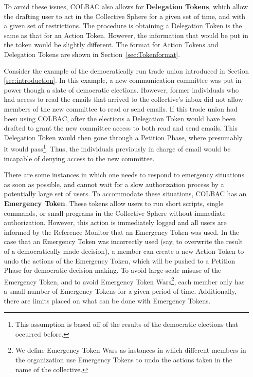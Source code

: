 To avoid these issues, COLBAC also allows for \textbf{Delegation Tokens}, which
allow the drafting user to act in the Collective Sphere for a given set of time,
and with a given set of restrictions. The procedure is obtaining a Delegation
Token is the same as that for an Action Token. However, the information that
would be put in the token would be slightly different. The format for Action
Tokens and Delegation Tokens are shown in Section~\ref{sec:Tokenformat}.

Consider the example of the democratically run trade union introduced in Section 
\ref{sec:introduction}. In this example, a new communication committee was put
in power though a slate of democratic elections. However, former individuals who
had access to read the emails that arrived to the collective's inbox did not
allow members of the new committee to read or send emails. If this trade union
had been using COLBAC, after the elections a Delegation Token would have been
drafted to grant the new committee access to both read and send emails. This
Delegation Token would then gone through a Petition Phase, where presumably it
would pass\footnote{This assumption is based off of the results of the
democratic elections that occurred before.}. Thus, the individuals previously in
charge of email would be incapable of denying access to the new committee.

There are some instances in which one needs to respond to emergency situations
as soon as possible, and cannot wait for a slow authorization process by a
potentially large set of users. To accommodate these situations, COLBAC has an
\textbf{Emergency Token}. These tokens allow users to run short scripts, single
commands, or small programs in the Collective Sphere without immediate
authorization. However, this action is immediately logged and all users are
informed by the Reference Monitor that an Emergency Token was used. In the case
that an Emergency Token was incorrectly used (say, to overwrite the result of
a democratically made decision), a member can create a new Action Token to
undo the actions of the Emergency Token, which will be pushed to a Petition
Phase for democratic decision making. To avoid large-scale misuse of the
Emergency Token, and to avoid Emergency Token Wars\footnote{We define Emergency
Token Wars as instances in which different members in the organization use
Emergency Tokens to undo the actions taken in the name of the collective.},
each member only has a small number of Emergency Tokens for a given period of
time. Additionally, there are limits placed on what can be done with Emergency
Tokens.

